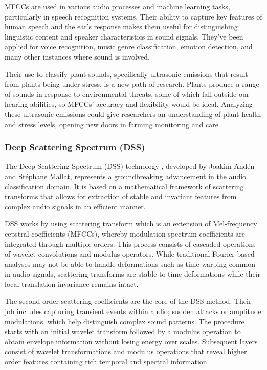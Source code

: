 MFCCs are used in various audio processes and machine learning tasks, particularly in speech recognition systems. Their ability to capture key features of human speech and the ear’s response makes them useful for distinguishing linguistic content and speaker characteristics in sound signals. They’ve been applied for voice recognition, music genre classification, emotion detection, and many other instances where sound is involved. \cite{zater_feature_2022}

Their use to classify plant sounds, specifically ultrasonic emissions that result from plants being under stress, is a new path of research. Plants produce a range of sounds in response to environmental threats, some of which fall outside our hearing abilities, so MFCCs’ accuracy and flexibility would be ideal. Analyzing these ultrasonic emissions could give researchers an understanding of plant health and stress levels, opening new doors in farming monitoring and care. \cite{Cell_Sounds_emitted_by_plants}

\subsubsection{Deep Scattering Spectrum (DSS)}
The Deep Scattering Spectrum (DSS) technology \cite{anden_deep_2014}, developed by Joakim Andén and Stéphane Mallat, represents a groundbreaking advancement in the audio classification domain. It is based on a mathematical framework of scattering transforms that allows for extraction of stable and invariant features from complex audio signals in an efficient manner.

DSS works by using scattering transform which is an extension of Mel-frequency cepstral coefficients (MFCCs), whereby modulation spectrum coefficients are integrated through multiple orders. This process consists of cascaded operations of wavelet convolutions and modulus operators. While traditional Fourier-based analyses may not be able to handle deformations such as time warping common in audio signals, scattering transforms are stable to time deformations while their local translation invariance remains intact.\cite{anden_deep_2014}

The second-order scattering coefficients are the core of the DSS method. Their job includes capturing transient events within audio; sudden attacks or amplitude modulations, which help distinguish complex sound patterns. The procedure starts with an initial wavelet transform followed by a modulus operation to obtain envelope information without losing energy over scales. Subsequent layers consist of wavelet transformations and modulus operations that reveal higher order features containing rich temporal and spectral information.\cite{anden_deep_2014}

